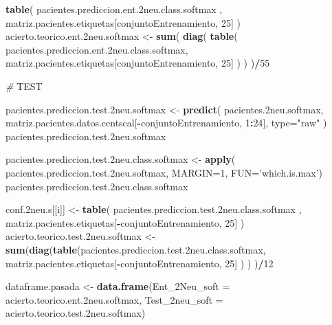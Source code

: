 \documentclass[]{article}
\newenvironment{Shaded}{\begin{snugshade}}{\end{snugshade}}
\newcommand{\AlertTok}[1]{\textcolor[rgb]{0.94,0.16,0.16}{#1}}
\newcommand{\CommentTok}[1]{\textcolor[rgb]{0.56,0.35,0.01}{\textit{#1}}}
\newcommand{\DataTypeTok}[1]{\textcolor[rgb]{0.13,0.29,0.53}{#1}}
\newcommand{\DecValTok}[1]{\textcolor[rgb]{0.00,0.00,0.81}{#1}}
\newcommand{\FloatTok}[1]{\textcolor[rgb]{0.00,0.00,0.81}{#1}}
\newcommand{\KeywordTok}[1]{\textcolor[rgb]{0.13,0.29,0.53}{\textbf{#1}}}
\newcommand{\NormalTok}[1]{#1}
\newcommand{\OperatorTok}[1]{\textcolor[rgb]{0.81,0.36,0.00}{\textbf{#1}}}
\newcommand{\StringTok}[1]{\textcolor[rgb]{0.31,0.60,0.02}{#1}}
\begin{document}
\begin{Shaded}
\begin{Highlighting}[]
  \KeywordTok{table}\NormalTok{( pacientes.prediccion.ent}\FloatTok{.2}\NormalTok{neu.class.softmax , matriz.pacientes.etiquetas[conjuntoEntrenamiento, }\DecValTok{25}\NormalTok{] )}
\NormalTok{  acierto.teorico.ent}\FloatTok{.2}\NormalTok{neu.softmax <-}\StringTok{ }\KeywordTok{sum}\NormalTok{( }\KeywordTok{diag}\NormalTok{( }\KeywordTok{table}\NormalTok{( pacientes.prediccion.ent}\FloatTok{.2}\NormalTok{neu.class.softmax, matriz.pacientes.etiquetas[conjuntoEntrenamiento, }\DecValTok{25}\NormalTok{] ) ) )}\OperatorTok{/}\DecValTok{55}
  
  \CommentTok{# }\AlertTok{TEST}
  
\NormalTok{  pacientes.prediccion.test}\FloatTok{.2}\NormalTok{neu.softmax <-}\StringTok{ }\KeywordTok{predict}\NormalTok{( pacientes}\FloatTok{.2}\NormalTok{neu.softmax, }
\NormalTok{                                                     matriz.pacientes.datos.centscal[}\OperatorTok{-}\NormalTok{conjuntoEntrenamiento, }\DecValTok{1}\OperatorTok{:}\DecValTok{24}\NormalTok{],}
                                                     \DataTypeTok{type=}\StringTok{"raw"}\NormalTok{ )}
\NormalTok{  pacientes.prediccion.test}\FloatTok{.2}\NormalTok{neu.softmax}
  
\NormalTok{  pacientes.prediccion.test}\FloatTok{.2}\NormalTok{neu.class.softmax <-}\StringTok{ }\KeywordTok{apply}\NormalTok{( pacientes.prediccion.test}\FloatTok{.2}\NormalTok{neu.softmax, }\DataTypeTok{MARGIN=}\DecValTok{1}\NormalTok{, }\DataTypeTok{FUN=}\StringTok{'which.is.max'}\NormalTok{)}
\NormalTok{  pacientes.prediccion.test}\FloatTok{.2}\NormalTok{neu.class.softmax}
  
\NormalTok{  conf}\FloatTok{.2}\NormalTok{neu.s[[i]] <-}\StringTok{ }\KeywordTok{table}\NormalTok{( pacientes.prediccion.test}\FloatTok{.2}\NormalTok{neu.class.softmax , matriz.pacientes.etiquetas[}\OperatorTok{-}\NormalTok{conjuntoEntrenamiento, }\DecValTok{25}\NormalTok{] )}
\NormalTok{  acierto.teorico.test}\FloatTok{.2}\NormalTok{neu.softmax <-}\StringTok{ }\KeywordTok{sum}\NormalTok{(}\KeywordTok{diag}\NormalTok{(}\KeywordTok{table}\NormalTok{(pacientes.prediccion.test}\FloatTok{.2}\NormalTok{neu.class.softmax, matriz.pacientes.etiquetas[}\OperatorTok{-}\NormalTok{conjuntoEntrenamiento, }\DecValTok{25}\NormalTok{] ) ) )}\OperatorTok{/}\DecValTok{12}
  
  
\NormalTok{  dataframe.pasada <-}\StringTok{ }\KeywordTok{data.frame}\NormalTok{(}\DataTypeTok{Ent_2Neu_soft =}\NormalTok{ acierto.teorico.ent}\FloatTok{.2}\NormalTok{neu.softmax,}
                                 \DataTypeTok{Test_2neu_soft =}\NormalTok{ acierto.teorico.test}\FloatTok{.2}\NormalTok{neu.softmax)}
  

\end{Highlighting}
\end{Shaded}
\end{document}

